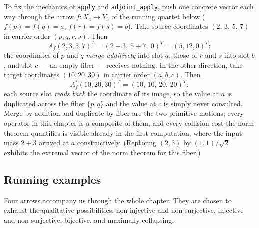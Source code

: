 \begin{example}\label{ch07:ex:coords}
To fix the mechanics of \texttt{apply} and \texttt{adjoint\_apply}, push one
concrete vector each way through the arrow $f:X_4\to Y_3$ of the running
quartet below ($f(p)=f(q)=a$, $f(r)=f(s)=b$). Take source coordinates
$(2,\,3,\,5,\,7)$ in carrier order $(p,q,r,s)$. Then
\[
A_f(2,3,5,7)^{T}=(2+3,\ 5+7,\ 0)^{T}=(5,12,0)^{T}:
\]
the coordinates of $p$ and $q$ \emph{merge additively} into slot $a$, those
of $r$ and $s$ into slot $b$, and slot $c$ --- an empty fiber --- receives
nothing. In the other direction, take target coordinates $(10,20,30)$ in
carrier order $(a,b,c)$. Then
\[
A_f^{*}(10,20,30)^{T}=(10,\,10,\,20,\,20)^{T}:
\]
each source slot \emph{reads back} the coordinate of its image, so the value
at $a$ is duplicated across the fiber $\{p,q\}$ and the value at $c$ is
simply never consulted. Merge-by-addition and duplicate-by-fiber are the two
primitive motions; every operator in this chapter is a composite of them,
and every collision cost the norm theorem quantifies is visible already in
the first computation, where the input mass $2+3$ arrived at $a$
constructively. (Replacing $(2,3)$ by $(1,1)/\sqrt2$ exhibits the extremal
vector of the norm theorem for this fiber.)
\end{example}

\subsection{Running examples}\label{ch07:sec:running}

Four arrows accompany us through the whole chapter. They are chosen to
exhaust the qualitative possibilities: non-injective and non-surjective,
injective and non-surjective, bijective, and maximally collapsing.

